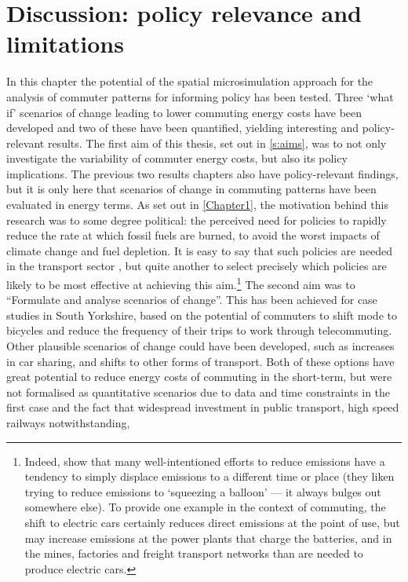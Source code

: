 \documentclass[a4paper, 11pt, twoside]{Thesis}
\begin{document}
\section{Discussion: policy relevance and limitations}
\label{fc8discus}
In this chapter the potential of the spatial microsimulation approach
for the analysis of commuter patterns 
for informing policy has been tested. Three `what if' scenarios of change
leading to lower commuting energy costs have been developed and two of
these have been quantified, yielding interesting and policy-relevant results.
The first aim of this thesis, set out in \cref{s:aims}, was to not
only investigate the variability of commuter energy costs, but also its
policy implications. The previous two results chapters also have policy-relevant
findings, but it is only here that scenarios of change in commuting patterns
have been evaluated in energy terms. As set out in \cref{Chapter1}, the
motivation behind this research was to some degree political: the perceived
need for policies to rapidly reduce the rate at which fossil fuels are burned,
to avoid the worst impacts of climate change and fuel depletion.
It is easy to say that such policies are needed in the transport sector
\citep{Chapman2007}, but quite another to select precisely which policies
are likely to be most effective at achieving this
aim.\footnote{Indeed, \citet{Berners-Lee2013}
show that many well-intentioned efforts to reduce emissions have
a tendency to simply displace emissions to a different time or place
(they liken trying to reduce emissions to `squeezing a balloon' --- it
always bulges out somewhere else). To provide one example in the context
of commuting, the shift to electric cars certainly reduces direct emissions
at the point of use, but may increase emissions at the power plants that
charge the batteries, and in the mines, factories and freight transport
networks than are needed to produce electric cars. 
}
The second aim  was to ``Formulate and analyse scenarios of change''.
This has been achieved for case studies in South Yorkshire, based on the
potential of commuters to shift mode to bicycles and reduce the frequency
of their trips to work through telecommuting. Other plausible scenarios of
change could have been developed, such as increases in car sharing, and
shifts to other forms of transport.
Both of these options have great potential to reduce energy costs of commuting
in the short-term, but were not formalised as quantitative scenarios due to
data and time constraints in the first case and the fact that widespread
investment in public transport, high speed railways notwithstanding,
\end{document}
